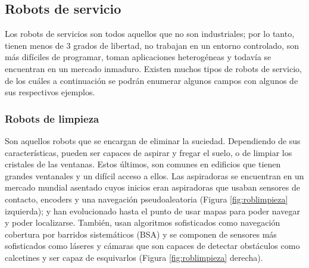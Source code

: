 \subsection{Robots de servicio}

Los robots de servicios son todos aquellos que no son industriales; por lo tanto, tienen menos de 3 grados de libertad, no trabajan en un entorno controlado, son más difíciles de programar, toman aplicaciones heterogéneas y todavía se encuentran en un mercado inmaduro. Existen muchos tipos de robots de servicio, de los cuáles a continuación se podrán enumerar algunos campos con algunos de sus respectivos ejemplos. \\ 


\subsubsection{Robots de limpieza}

Son aquellos robots que se encargan de eliminar la suciedad. Dependiendo de sus características, pueden ser capaces de aspirar y fregar el suelo, o de limpiar los cristales de las ventanas. Estos últimos, son comunes en edificios que tienen grandes ventanales y un difícil acceso a ellos. Las aspiradoras se encuentran en un mercado mundial asentado cuyos inicios eran aspiradoras que usaban sensores de contacto, encoders y una navegación pseudoaleatoria (Figura \ref{fig:roblimpieza} izquierda); y han evolucionado hasta el punto de usar mapas para poder navegar y poder localizarse. También, usan algoritmos sofisticados como navegación cobertura por barridos sistemáticos (BSA) y se componen de sensores más sofisticados como láseres y cámaras que son capaces de detectar obstáculos como calcetines y ser capaz de esquivarlos (Figura \ref{fig:roblimpieza} derecha).


